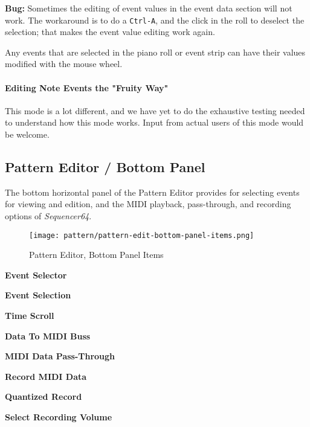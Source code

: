    \textbf{Bug:}
   Sometimes the editing of event values in the event data section will not work.
   The workaround is to do a \texttt{Ctrl-A}, and the click in the roll
   to deselect the selection; that makes the event value editing work again.
   
   Any events that are selected in the piano roll or event strip can have
   their values modified with the mouse wheel.

\paragraph{Editing Note Events the "Fruity Way"}
\label{paragraph:seq64_pattern_editor_note_events_fruity}

   This mode is a lot different, and we have yet to do the exhaustive testing
   needed to understand how this mode works.  Input from actual users of this
   mode would be welcome.

\subsection{Pattern Editor / Bottom Panel}
\label{subsec:seq64_pattern_editor_bottom}

   The bottom horizontal panel of the Pattern Editor provides for
   selecting events for viewing and edition, and the MIDI playback,
   pass-through, and recording options of \textsl{Sequencer64}.

\begin{figure}[H]
   \centering 
   \texttt{[image: pattern/pattern-edit-bottom-panel-items.png]}
   \caption{Pattern Editor, Bottom Panel Items}
   \label{fig:pattern_editor_bottom_panel_items}
\end{figure}

   \begin{enumber}
      \item \textbf{Event Selector}
      \item \textbf{Event Selection}
      \item \textbf{Time Scroll}
      \item \textbf{Data To MIDI Buss}
      \item \textbf{MIDI Data Pass-Through}
      \item \textbf{Record MIDI Data}
      \item \textbf{Quantized Record}
      \item \textbf{Select Recording Volume}
   \end{enumber}

